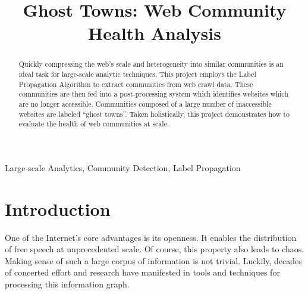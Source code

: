 \documentclass[conference]{IEEEtran}
\begin{document}
\title{Ghost Towns: Web Community Health Analysis}

\author{
\and
{}
\and
{}
}

\maketitle

\begin{abstract}
Quickly compressing the web's scale and heterogeneity into similar communities is an ideal task for large-scale analytic techniques. This project employs the Label Propagation Algorithm to extract communities from web crawl data. These communities are then fed into a post-processing system which identifies websites which are no longer accessible. Communities composed of a large number of inaccessible websites are labeled ``ghost towns''. Taken holistically, this project demonstrates how to evaluate the health of web communities at scale.
\end{abstract}

\begin{IEEEkeywords}
Large-scale Analytics, Community Detection, Label Propagation
\end{IEEEkeywords}

\section{Introduction}

One of the Internet's core advantages is its openness. It enables the distribution of free speech at unprecedented scale. Of course, this property also leads to chaos. Making sense of such a large corpus of information is not trivial. Luckily, decades of concerted effort and research have manifested in tools and techniques for processing this information graph.
\end{document}
